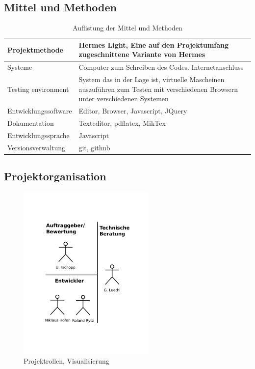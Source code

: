 \documentclass[11pt,paper=a4,final]{scrartcl}
\begin{document}
\subsection{Mittel und Methoden}
\begin{table}[h!]
 \centering
  \begin{tabular}{|p{4cm}|p{12cm}|}
  \hline
  Projektmethode & Hermes Light, Eine auf den Projektumfang zugeschnittene
  Variante von Hermes \\ \hline Systeme & Computer zum Schreiben des Codes.
  Internetanschluss \\ \hline Testing environment & System das in der Lage ist,
  virtuelle Mascheinen auszuf\"uhren zum Testen mit verschiedenen Browsern unter
  verschiedenen Systemen \\ \hline Entwicklungssoftware & Editor, Browser,
  Javascript, JQuery \\ \hline Dokumentation & Texteditor, pdflatex, MikTex \\
  \hline Entwicklungssprache & Javascript \\ \hline Versionsverwaltung & git,
  github \\ \hline
  \end{tabular}
  \caption{Auflistung der Mittel und Methoden}
\end{table}
\subsection{Projektorganisation}
\begin{figure}[h!]
  \centering
  \includegraphics[width=0.6\textwidth]{rollen.pdf}
  \caption{Projektrollen, Visualisierung}
  \label{fig:projektrollen}
\end{figure}
\newpage
\end{document}
